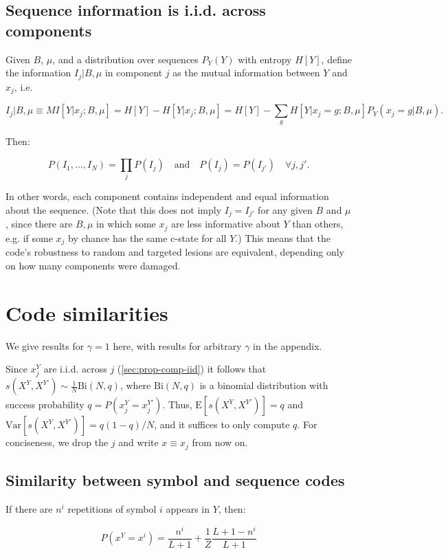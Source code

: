 \documentclass{article}
\begin{document}
\subsection{Sequence information is i.i.d. across components}
\label{sec:prop-info-iid}

Given $B$, $\mu$, and a distribution over sequences $P_Y(Y)$ with entropy $H[Y]$, define the information $I_j | B, \mu$ in component $j$ as the mutual information between $Y$ and $x_j$, i.e.

$$I_j | B, \mu \equiv MI[Y|x_j; B, \mu] = H[Y] - H[Y|x_j; B, \mu] = H[Y] - \sum_g H[Y|x_j = g; B, \mu] P_Y(x_j = g| B, \mu).$$

Then:

$$P(I_1, ..., I_N) = \prod_j P(I_j) \quad \textrm{and} \quad P(I_j) = P(I_{j'}) \quad \forall j, j'.$$

In other words, each component contains independent and equal information about the sequence. (Note that this does not imply $I_j = I_{j'}$ for any given $B$ and $\mu$, since there are $B, \mu$ in which some $x_j$ are less informative about $Y$ than others, e.g. if some $x_j$ by chance has the same c-state for all $Y$.) This means that the code's robustness to random and targeted lesions are equivalent, depending only on how many components were damaged.

\section{Code similarities}

We give results for $\gamma = 1$ here, with results for arbitrary $\gamma$ in the appendix.

Since $x^Y_j$ are i.i.d. across $j$ (\ref{sec:prop-comp-iid}) it follows that $s(X^Y, X^{Y'}) \sim \frac{1}{N}\textrm{Bi}(N, q)$, where $\textrm{Bi}(N, q)$ is a binomial distribution with success probability $q = P(x^Y_j = x^{Y'}_j)$. Thus, $\textrm{E}[s(X^Y, X^{Y'})] = q$ and $\textrm{Var}[s(X^Y, X^{Y'})] = q(1-q)/N$, and it suffices to only compute $q$. For conciseness, we drop the $j$ and write $x \equiv x_j$ from now on. 

\subsection{Similarity between symbol and sequence codes}

If there are $n^i$ repetitions of symbol $i$ appears in $Y$, then:

$$P(x^Y = x^i) = \frac{n^i}{L+1} + \frac{1}{Z}\frac{L+1-n^i}{L+1}$$
\end{document}
